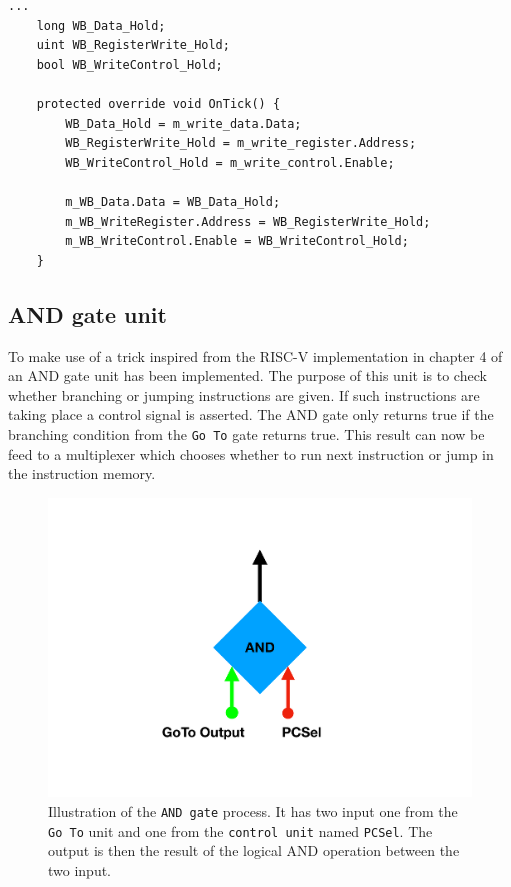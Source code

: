         \begin{minipage}{\linewidth}
            \begin{lstlisting}[language={[Sharp]C}, caption={A slice of the \texttt{Write Back} process SME code. It contains 3 variables, which will hold the incomming values, which gets outputted unchanged in the same clock cycle.},captionpos=b, label = WB]
...
    long WB_Data_Hold;
    uint WB_RegisterWrite_Hold;
    bool WB_WriteControl_Hold;
    
    protected override void OnTick() {
        WB_Data_Hold = m_write_data.Data;
        WB_RegisterWrite_Hold = m_write_register.Address;
        WB_WriteControl_Hold = m_write_control.Enable;
    
        m_WB_Data.Data = WB_Data_Hold;
        m_WB_WriteRegister.Address = WB_RegisterWrite_Hold;
        m_WB_WriteControl.Enable = WB_WriteControl_Hold;
    }
            \end{lstlisting}
        \end{minipage} 
    
    \subsection{AND gate unit}
        To make use of a trick inspired from the RISC-V implementation in chapter 4 of \cite{riscVbook} an AND gate unit has been implemented. The purpose of this unit is to check whether branching or jumping instructions are given. If such instructions are taking place a control signal is asserted. The AND gate only returns true if the branching condition from the \texttt{Go To} gate returns true. This result can now be feed to a multiplexer which chooses whether to run next instruction or jump in the instruction memory.
        
        \begin{figure}[h!]
            \centering
            \includegraphics[scale=0.35]{pictures/AND.pdf}
            \caption{Illustration of the \texttt{AND gate} process. It has two input one from the \texttt{Go To} unit and one from the \texttt{control unit} named \texttt{PCSel}. The output is then the result of the logical AND operation between the two input.}
            \label{fig:AND}
        \end{figure}
    
